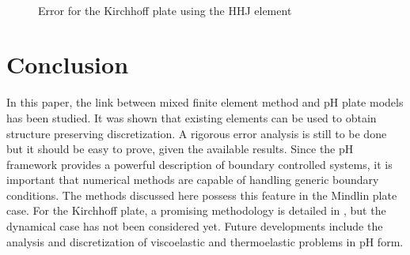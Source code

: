 \documentclass{ifacconf}
\begin{document}
\begin{figure}[ht]%
	\centering
	\hspace{8pt}%
	 \\
	\caption[errorHHF]{Error for the Kirchhoff plate using the HHJ element}%
	\label{fig:errorHHJ}%
\end{figure}

\section{Conclusion}
In this paper, the link between mixed finite element method and pH plate models has been studied. It was shown that existing elements can be used to obtain structure preserving discretization. A rigorous error analysis is still to be done but it should be easy to prove, given the available results. Since the pH framework provides a powerful description of boundary controlled systems, it is important that numerical methods are capable of handling generic boundary conditions. The methods discussed here possess this feature in the Mindlin plate case. For the Kirchhoff plate, a promising methodology is detailed in \cite{mixed_kirchhoff}, but the dynamical case has not been considered yet. Future developments include the analysis and discretization of viscoelastic and thermoelastic problems in pH form.
\end{document}
